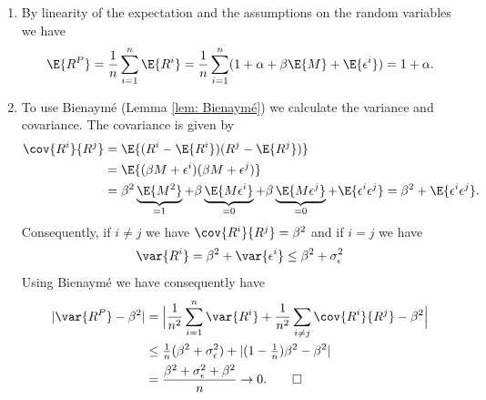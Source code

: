 \begin{solution}
\begin{enumerate}[wide=0pt]
    \item[\ref{it: (diversification) expected return}]
    By linearity of the expectation and the assumptions on the random variables we have 
    \[
        \E{R^P}
        = \frac1n \sum_{i=1}^n \E{R^i}
        = \frac1n \sum_{i=1}^n (1 + \alpha + \beta \E{M} + \E{\epsilon^i})
        = 1 + \alpha.
    \]

    \item[\ref{it: (diversification) variance}]
    To use Bienaymé (Lemma \ref{lem: Bienaymé}) we calculate the
    variance and covariance. The covariance is given by
    \begin{align*}
        \cov{R^i}{R^j}
        &= \E{(R^i - \E{R^i})(R^j - \E{R^j})}
        \\
        &= \E{(\beta M + \epsilon^i)(\beta M + \epsilon^j)}
        \\
        &= \beta^2 \underbrace{\E{M^2}}_{=1} + \beta \underbrace{\E{M\epsilon^i}}_{=0} +
        \beta \underbrace{\E{M\epsilon^j}}_{=0} +
        \E{\epsilon^i\epsilon^j}
        = \beta^2 + \E{\epsilon^i\epsilon^j}.
    \end{align*}
    Consequently, if \(i \neq j\) we have \(\cov{R^i}{R^j} = \beta^2\) and if \(i=j\) we have
    \[
        \var{R^i} = \beta^2 + \var{\epsilon^i} \le \beta^2 + \sigma_\epsilon^2
    \]
    Using Bienaymé we have consequently have
    \begin{align*}
        \abs{\var{R^P} - \beta^2}
        &= \abs[\Big]{\frac1{n^2}\sum_{i=1}^n \var{R^i} + \frac1{n^2}\sum_{i\neq j} \cov{R^i}{R^j} - \beta^2}
        \\
        &\le \tfrac1{n}(\beta^2 + \sigma_\epsilon^2) + \abs{(1-\tfrac1{n})\beta^2 - \beta^2}
        \\
        &= \frac{\beta^2 + \sigma_\epsilon^2 + \beta^2}{n}
        \to 0.
        \qedhere
    \end{align*}
\end{enumerate}
\end{solution}
